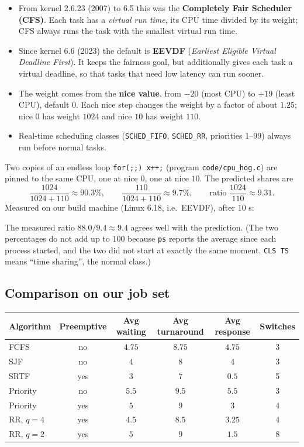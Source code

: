 \documentclass[11pt,a4paper]{article}
\newcommand{\term}[1]{\textbf{\color{mintdeep}#1}}
\newcommand{\cmd}[1]{\texttt{#1}}
\begin{document}
\begin{itemize}
  \item From kernel 2.6.23 (2007) to 6.5 this was the \textbf{Completely Fair Scheduler (CFS)}. Each task has a \emph{virtual run time}, its CPU time divided by its weight; CFS always runs the task with the smallest virtual run time.
  \item Since kernel 6.6 (2023) the default is \textbf{EEVDF} (\emph{Earliest Eligible Virtual Deadline First}). It keeps the fairness goal, but additionally gives each task a virtual deadline, so that tasks that need low latency can run sooner.
  \item The weight comes from the \term{nice value}, from $-20$ (most CPU) to $+19$ (least CPU), default $0$. Each nice step changes the weight by a factor of about $1.25$; nice $0$ has weight $1024$ and nice $10$ has weight $110$.
  \item Real-time scheduling classes (\texttt{SCHED\_FIFO}, \texttt{SCHED\_RR}, priorities $1$--$99$) always run before normal tasks.
\end{itemize}

\begin{example}
Two copies of an endless loop \texttt{for(;;) x++;} (program \texttt{code/cpu\_hog.c}) are pinned to the same CPU, one at nice $0$, one at nice $10$. The predicted shares are
\[
\frac{1024}{1024+110} \approx 90.3\%, \qquad \frac{110}{1024+110} \approx 9.7\%, \qquad \text{ratio } \frac{1024}{110} \approx 9.31 .
\]
Measured on our build machine (Linux 6.18, i.e.\ EEVDF), after $10$ s:

The measured ratio $88.0/9.4 \approx 9.4$ agrees well with the prediction. (The two percentages do not add up to $100$ because \cmd{ps} reports the average since each process started, and the two did not start at exactly the same moment. \texttt{CLS TS} means ``time sharing'', the normal class.)
\end{example}

\subsection{Comparison on our job set}

\begin{center}
\renewcommand{\arraystretch}{1.2}
\begin{tabular}{@{}lccccc@{}}
\toprule
\textbf{Algorithm} & \textbf{Preemptive} & \textbf{Avg waiting} & \textbf{Avg turnaround} & \textbf{Avg response} & \textbf{Switches}\\
\midrule
FCFS & no & $4.75$ & $8.75$ & $4.75$ & 3\\
SJF & no & $4$ & $8$ & $4$ & 3\\
SRTF & yes & $3$ & $7$ & $0.5$ & 5\\
Priority & no & $5.5$ & $9.5$ & $5.5$ & 3\\
Priority & yes & $5$ & $9$ & $3$ & 4\\
RR, $q = 4$ & yes & $4.5$ & $8.5$ & $3.25$ & 4\\
RR, $q = 2$ & yes & $5$ & $9$ & $1.5$ & 8\\
\bottomrule
\end{tabular}
\end{center}
\end{document}

